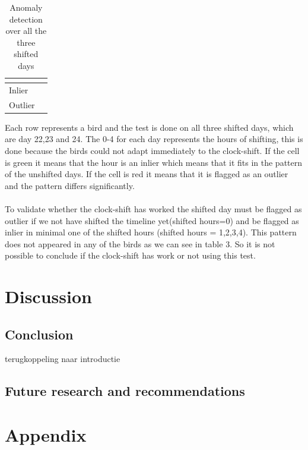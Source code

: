 \documentclass[a4paper]{article}
\begin{document}
\begin{table}[H]
\begin{tabular}{llllllllllllllll}
\multicolumn{16}{l}{} \\ \hline
\multicolumn{1}{|l|}{Inlier} & \multicolumn{15}{l|}{\cellcolor[HTML]{4ECF94}} \\ \hline
\multicolumn{1}{|l|}{Outlier} & \multicolumn{15}{l|}{\cellcolor[HTML]{EA6D67}} \\ \hline
\end{tabular}
\caption{Anomaly detection over all the three shifted days}
\end{table}
Each row represents a bird and the test is done on all three shifted days, which are day 22,23 and 24. The 0-4 for each day represents the hours of shifting, this is done because the birds could not adapt immediately to the clock-shift. If the cell is green it means that the hour is an inlier which means that it fits in the pattern of the unshifted days. If the cell is red it means that it is flagged as an outlier and the pattern differs significantly.\\\\
To validate whether the clock-shift has worked the shifted day must be flagged as outlier if we not have shifted the timeline yet(shifted hours=0) and be flagged as inlier in minimal one of the shifted hours (shifted hours = 1,2,3,4). This pattern does not appeared in any of the birds as we can see in table 3. So it is not possible to conclude if the clock-shift has work or not using this test. 


\section*{Discussion}


\subsection*{Conclusion}
terugkoppeling naar introductie

\subsection*{Future research and recommendations}



\section*{Appendix}
\end{document}
